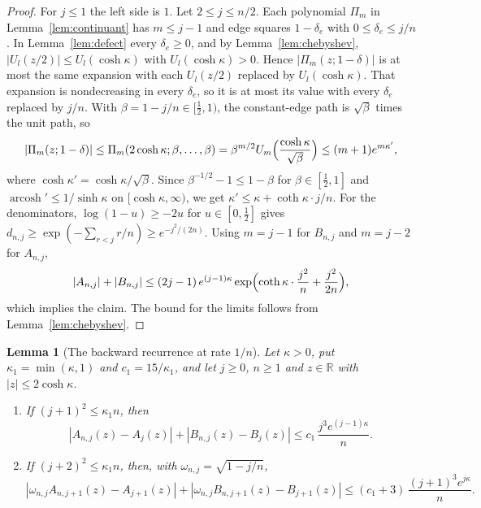 \documentclass[11pt]{amsart}
\newtheorem{lemma}[theorem]{Lemma}
\theoremstyle{definition}
\theoremstyle{remark}
\numberwithin{equation}{section}
\newcommand{\R}{\mathbb{R}}
\DeclareMathOperator{\arcosh}{arcosh}
\begin{document}
\begin{proof}
For $j\le1$ the left side is $1$. Let $2\le j\le n/2$. Each polynomial $\Pi_m$ in Lemma~\ref{lem:continuant} has $m\le j-1$ and edge squares $1-\delta_e$ with $0\le\delta_e\le j/n$. In Lemma~\ref{lem:defect} every $\delta_e\ge0$, and by Lemma~\ref{lem:chebyshev}, $|U_l(z/2)|\le U_l(\cosh\kappa)$ with $U_l(\cosh\kappa)>0$. Hence $|\Pi_m(z;1-\delta)|$ is at most the same expansion with each $U_l(z/2)$ replaced by $U_l(\cosh\kappa)$. That expansion is nondecreasing in every $\delta_e$, so it is at most its value with every $\delta_e$ replaced by $j/n$. With $\beta=1-j/n\in[\frac12,1)$, the constant-edge path is $\sqrt\beta$ times the unit path, so
\[
|\Pi_m(z;1-\delta)|\le\Pi_m(2\cosh\kappa;\beta,\dots,\beta)=\beta^{m/2}U_m\Bigl(\frac{\cosh\kappa}{\sqrt\beta}\Bigr)\le(m+1)e^{m\kappa'},
\]
where $\cosh\kappa'=\cosh\kappa/\sqrt\beta$. Since $\beta^{-1/2}-1\le1-\beta$ for $\beta\in[\frac12,1]$ and $\arcosh'\le1/\sinh\kappa$ on $[\cosh\kappa,\infty)$, we get $\kappa'\le\kappa+\coth\kappa\cdot j/n$. For the denominators, $\log(1-u)\ge-2u$ for $u\in[0,\frac12]$ gives $d_{n,j}\ge\exp(-\sum_{r<j}r/n)\ge e^{-j^2/(2n)}$. Using $m=j-1$ for $B_{n,j}$ and $m=j-2$ for $A_{n,j}$,
\[
|A_{n,j}|+|B_{n,j}|\le(2j-1)\,e^{(j-1)\kappa}\exp\Bigl(\coth\kappa\cdot\frac{j^2}{n}+\frac{j^2}{2n}\Bigr),
\]
which implies the claim. The bound for the limits follows from Lemma~\ref{lem:chebyshev}.
\end{proof}

\begin{lemma}[The backward recurrence at rate $1/n$]\label{lem:head-rate}
Let $\kappa>0$, put $\kappa_1=\min(\kappa,1)$ and $c_1=15/\kappa_1$, and let $j\ge0$, $n\ge1$ and $z\in\R$ with $|z|\le2\cosh\kappa$.
\begin{enumerate}
\item[(a)] If $(j+1)^2\le\kappa_1n$, then
\[
|A_{n,j}(z)-A_j(z)|+|B_{n,j}(z)-B_j(z)|\le c_1\,\frac{j^3e^{(j-1)\kappa}}{n}.
\]
\item[(b)] If $(j+2)^2\le\kappa_1n$, then, with $\omega_{n,j}=\sqrt{1-j/n}$,
\[
|\omega_{n,j}A_{n,j+1}(z)-A_{j+1}(z)|+|\omega_{n,j}B_{n,j+1}(z)-B_{j+1}(z)|\le(c_1+3)\,\frac{(j+1)^3e^{j\kappa}}{n}.
\]
\end{enumerate}
\end{lemma}
\end{document}
